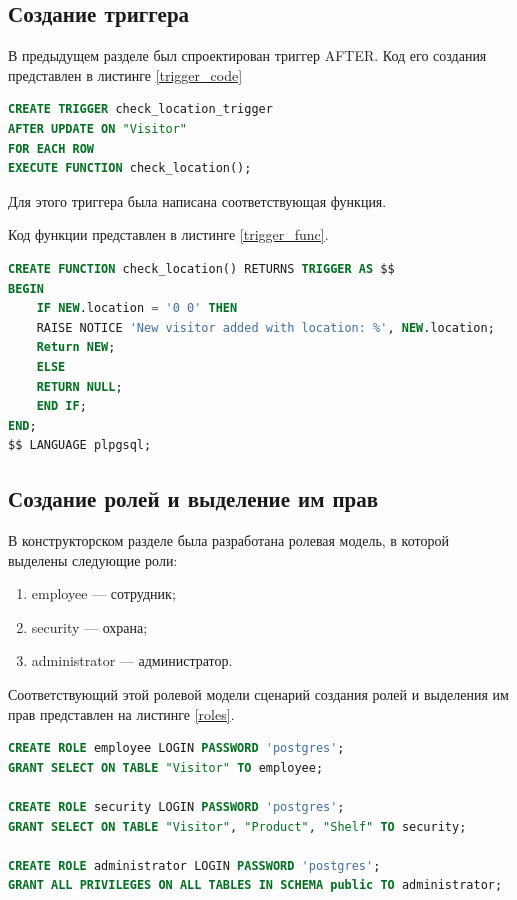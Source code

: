 \subsection{Создание триггера}

В предыдущем разделе был спроектирован триггер AFTER.
Код его создания представлен в листинге \ref{trigger_code}

\captionsetup{singlelinecheck = false, justification=raggedright}
\begin{lstlisting}[language=sql, caption=Реализация триггера AFTER, label=trigger_code]
CREATE TRIGGER check_location_trigger
AFTER UPDATE ON "Visitor"
FOR EACH ROW
EXECUTE FUNCTION check_location();
\end{lstlisting}
\captionsetup{singlelinecheck = false, justification=centering}

Для этого триггера была написана соответствующая функция.


Код функции представлен в листинге \ref{trigger_func}.

\captionsetup{singlelinecheck = false, justification=raggedright}
\begin{lstlisting}[language=sql, caption=Реализация функции, label=trigger_func]
CREATE FUNCTION check_location() RETURNS TRIGGER AS $$
BEGIN
    IF NEW.location = '0 0' THEN
    RAISE NOTICE 'New visitor added with location: %', NEW.location;
    Return NEW;
    ELSE
    RETURN NULL;
    END IF;
END;
$$ LANGUAGE plpgsql;
\end{lstlisting}
\captionsetup{singlelinecheck = false, justification=centering}

\subsection{Создание ролей и выделение им прав}

В конструкторском разделе была разработана ролевая модель, в которой выделены
следующие роли:
\begin{enumerate}[label=\arabic*.]
    \item employee --- сотрудник;
    \item security --- охрана;
    \item administrator --- администратор.
\end{enumerate}

Соответствующий этой ролевой модели сценарий создания ролей и выделения им прав
представлен на листинге \ref{roles}.

\begin{lstlisting}[language=sql, caption=Создание ролей и выделение им прав, label=roles]
CREATE ROLE employee LOGIN PASSWORD 'postgres';
GRANT SELECT ON TABLE "Visitor" TO employee;

CREATE ROLE security LOGIN PASSWORD 'postgres';
GRANT SELECT ON TABLE "Visitor", "Product", "Shelf" TO security;

CREATE ROLE administrator LOGIN PASSWORD 'postgres';
GRANT ALL PRIVILEGES ON ALL TABLES IN SCHEMA public TO administrator;

\end{lstlisting}
\captionsetup{singlelinecheck = false, justification=centering}

